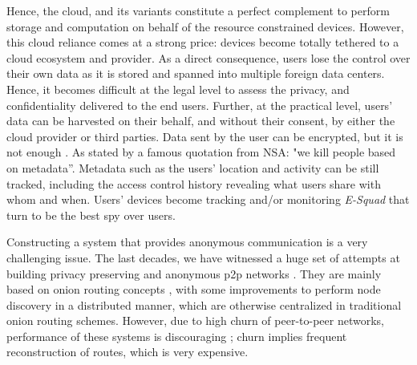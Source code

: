 Hence, the cloud, and its variants constitute a perfect complement
to perform storage and computation on behalf of the resource
constrained devices. However, this cloud reliance comes at a strong price:
devices become totally tethered to a cloud ecosystem and provider. As
a direct consequence, users lose the control over their own data as it is
stored and spanned into multiple foreign data centers. Hence, it becomes difficult at 
the legal level to assess the privacy, and
confidentiality delivered to the end users. Further, at the practical
level, users' data can be harvested on their behalf, and without their
consent, by either the cloud provider or third parties.
Data sent by the user can be encrypted, but it is not enough
\cite{granick_2017, HooffLZZ15, HarnikPS10}.  As stated by a famous quotation from
NSA: "we kill people based on metadata''. Metadata such as the users'
location and activity can be still tracked, including the access
control history revealing what users share with whom and when.
Users’ devices become tracking and/or monitoring \textit{E-Squad} that turn to
be the best spy over users. 

Constructing a system that provides anonymous communication is a very
challenging issue. The last decades, we have witnessed a
 huge set of attempts at building privacy preserving and anonymous p2p
 networks \cite{Clarke:2001, Gnunet2002, Freedman:2002, Nambiar:2006,
   Rennhard:2002}. They are mainly based on onion
 routing concepts \cite{Chaum:1981}, with some improvements to perform node
 discovery in a distributed manner, which are otherwise
centralized in traditional onion routing schemes. However, due to high
churn of peer-to-peer networks, performance of these systems is
discouraging \cite{LeBlond:2013}; churn implies frequent
reconstruction of routes, which is very expensive.

